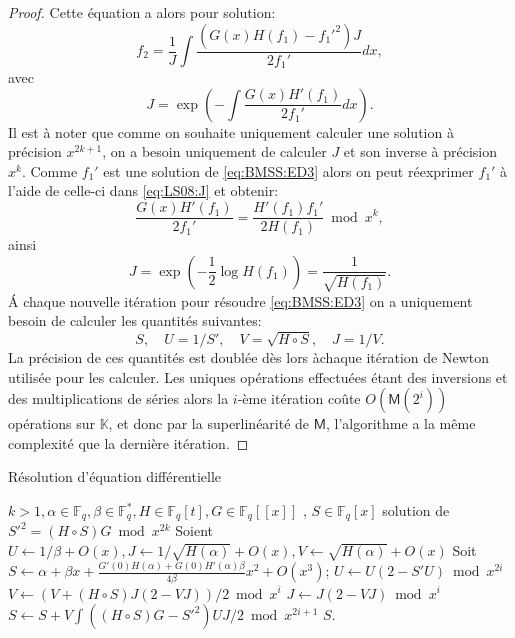 \documentclass[10pt,a4paper]{book}
\theoremstyle{plain}
\theoremstyle{definition}
\theoremstyle{definition}
\theoremstyle{definition}
\theoremstyle{definition}
\theoremstyle{remark}
\theoremstyle{remark}
\theoremstyle{definition}
\begin{document}
\begin{proof}
 Cette équation a alors pour solution:
\begin{equation}
f_2=\frac{1}{J}\int \frac{(G(x)H(f_1)-f_1'^2)J}{2f_1'} dx,
\end{equation}
avec 
\begin{equation}
\label{eq:LS08:J}
J=\exp \left( -\int \frac{G(x)H'(f_1)}{2f_1'}dx \right).
\end{equation}
Il est à noter que comme on souhaite uniquement calculer une solution à précision $x^{2k+1}$, on a besoin uniquement de calculer $J$ et son inverse à précision $x^k$.
Comme $f_1'$ est une solution de \eqref{eq:BMSS:ED3} alors on peut réexprimer $f_1'$ à l'aide de celle-ci dans \eqref{eq:LS08:J} et obtenir:
\begin{equation}
\frac{G(x)H'(f_1)}{2f_1'}=\frac{H'(f_1)f_1'}{2H(f_1)} \bmod x^k,
\end{equation}
ainsi 
\begin{equation}
J=\exp \left(-\frac{1}{2}\log H(f_1) \right)= \frac{1}{\sqrt{H(f_1)}}.
\end{equation}
\'A chaque nouvelle itération pour résoudre \eqref{eq:BMSS:ED3} on a uniquement besoin de calculer les quantités suivantes:
\begin{equation}
S, \quad U=1/S', \quad V=\sqrt{H \circ S}, \quad J=1/V.
\end{equation}
La précision de ces quantités est doublée dès lors àchaque itération de Newton utilisée pour les calculer. Les uniques opérations effectuées étant des inversions et des multiplications de séries alors la $i$-ème itération coûte $O(\mathsf{M}(2^i))$ opérations sur $\mathbb{K}$, et donc par la superlinéarité de $\mathsf{M}$, l'algorithme a la même complexité que la dernière itération. 
\end{proof}


\begin{algorithm}
\caption{\label{alg:BMSS:eqdiff} Résolution d'équation différentielle}
\begin{algorithmic}[1]
\REQUIRE $k>1, \alpha \in \mathbb{F}_q, \beta \in \mathbb{F}_q^*, H \in \mathbb{F}_q[t], G \in \mathbb{F}_{q}[[x]]$ ,%
\ENSURE $S \in \mathbb{F}_q[x]$ solution de $S'^2=(H \circ S)G \bmod x^{2k}$
\STATE Soient $U \gets 1/\beta + O(x), J \gets 1/\sqrt{H(\alpha)}+O(x), V \gets \sqrt{H(\alpha)} + O(x)$
\STATE Soit $S \gets \alpha + \beta x + \frac{G'(0)H(\alpha)+G(0)H'(\alpha)\beta}{4\beta}x^2+O(x^3)$;
\STATE $U \gets U(2-S'U) \bmod x^{2i}$
\STATE $V \gets (V+(H \circ S)J(2-VJ))/2 \bmod x^{i}$
\STATE $J \gets J(2-VJ) \bmod {x^i}$
\STATE $S \gets S+V \int ((H \circ S)G-S'^2)UJ/2 \bmod x^{2i+1}$
\ENDFOR
\RETURN$S$. 
\end{algorithmic}
\end{algorithm}
\end{document}
